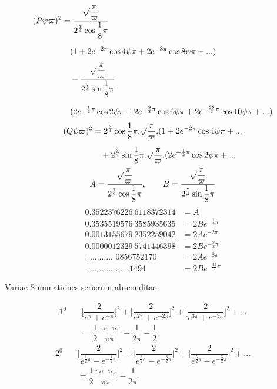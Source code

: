\[
\begin{aligned}
(P\psi\varpi)^2
&=\dfrac{\surd\dfrac\pi\varpi}{2^{\frac74}\cos\dfrac18\pi}
\\[6pt]&\quad{}(1+2e^{-2\pi}\cos4\psi\pi+2e^{-8\pi}\cos8\psi\pi+\mathord{.}\mathord{.}\mathord{.})\\[4pt]
&\quad-\dfrac{\surd\dfrac\pi\varpi}{2^{\frac74}\sin\dfrac18\pi}
\\[7pt]&\quad{}(2e^{-\frac12\pi}\cos2\psi\pi+2e^{-\frac92\pi}\cos6\psi\pi
+2e^{-\frac{25}2\pi}\cos10\psi\pi+\mathord{.}\mathord{.}\mathord{.})
\end{aligned}
\]
\[
\begin{aligned}
(Q\psi\varpi)^2
&=2^{\frac34}\cos\dfrac18\pi.\surd\dfrac\pi\varpi.
(1+2e^{-2\pi}\cos4\psi\pi+\mathord{.}\mathord{.}\mathord{.}\\[5pt]
&\quad+2^{\frac34}\sin\dfrac18\pi.\surd\dfrac\pi\varpi.
(2e^{-\frac12\pi}\cos2\psi\pi+\mathord{.}\mathord{.}\mathord{.}
\end{aligned}
\]
\[
A=\dfrac{\surd\dfrac\pi\varpi}{2^{\frac72}\cos\dfrac18\pi},
\qquad
B=\dfrac{\surd\dfrac\pi\varpi}{2^{\frac74}\sin\dfrac18\pi}
\]
\[
\begin{aligned}
0.3522376226\ 6118372314&=A\\[5pt]
0.3535519576\ 3585935635&=2Be^{-\frac12\pi}\\[5pt]
0.0013155679\ 2352259042&=2Ae^{-2\pi}\\[5pt]
0.0000012329\ 5741446398&=2Be^{-\frac92\pi}\\[5pt]
\text{. .......... 0856752170}&=2Ae^{-8\pi}\\[5pt]
\text{. .......... ......1494}&=2Be^{-\frac{25}2\pi}
\end{aligned}
\]
\begin{center}Variae Summationes serierum absconditae.\end{center}
\[
\begin{aligned}1^{0}\quad&
\biggl[\dfrac{2}{e^\pi+e^{-\pi}}\biggr]^2
+\biggl[\dfrac{2}{e^{2\pi}+e^{-2\pi}}\biggr]^2
+\biggl[\dfrac{2}{e^{3\pi}+e^{-3\pi}}\biggr]^2+\mathord{.}\mathord{.}\mathord{.}
\\[8pt]&=\dfrac12\dfrac{\varpi\varpi}{\pi\pi}-\dfrac{1}{2\pi}-\dfrac12\end{aligned}
\]
\[
\begin{aligned}2^{0}\quad&
\biggl[\dfrac{2}{e^{\frac12\pi}-e^{-\frac12\pi}}\biggr]^2
+\biggl[\dfrac{2}{e^{\frac32\pi}-e^{-\frac32\pi}}\biggr]^2
+\biggl[\dfrac{2}{e^{\frac52\pi}-e^{-\frac52\pi}}\biggr]^2+\mathord{.}\mathord{.}\mathord{.}
\\[8pt]&=\dfrac12\dfrac{\varpi\varpi}{\pi\pi}-\dfrac{1}{2\pi}\end{aligned}
\]

